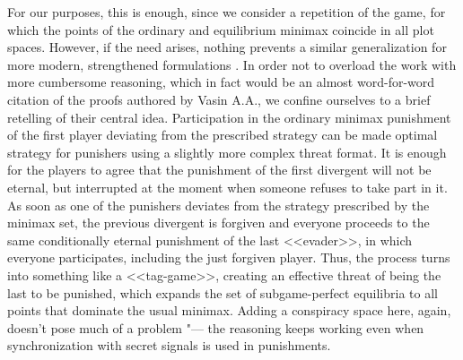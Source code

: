 For our purposes, this is enough, since we consider a repetition of the game, for which the points of the ordinary and equilibrium minimax coincide in all plot spaces. However, if the need arises, nothing prevents a similar generalization for more modern, strengthened formulations \cite{Vasin}. In order not to overload the work with more cumbersome reasoning, which in fact would be an almost word-for-word citation of the proofs authored by Vasin A.A., we confine ourselves to a brief retelling of their central idea. Participation in the ordinary minimax punishment of the first player deviating from the prescribed strategy can be made optimal strategy for punishers using a slightly more complex threat format. It is enough for the players to agree that the punishment of the first divergent will not be eternal, but interrupted at the moment when someone refuses to take part in it. As soon as one of the punishers deviates from the strategy prescribed by the minimax set, the previous divergent is forgiven and everyone proceeds to the same conditionally eternal punishment of the last <<evader>>, in which everyone participates, including the just forgiven player. Thus, the process turns into something like a <<tag-game>>, creating an effective threat of being the last to be punished, which expands the set of subgame-perfect equilibria to all points that dominate the usual minimax. Adding a conspiracy space here, again, doesn't pose much of a problem "--- the reasoning keeps working even when synchronization with secret signals is used in punishments. %

